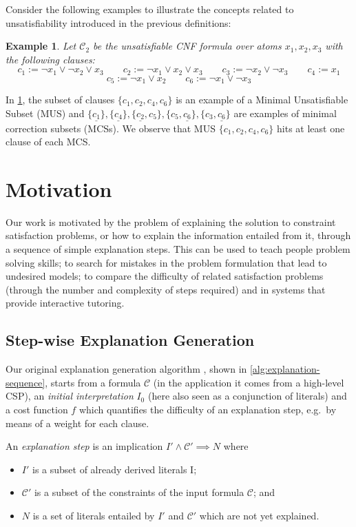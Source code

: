 \documentclass[twoside,11pt]{article}
\newcommand\m[1]{\mathcal{#1}}
\newtheorem{example}{Example}
\newcommand\formulac{\ensuremath{\m{C} }\xspace}
\begin{document}
Consider the following examples to illustrate the concepts related to unsatisfiability introduced in the previous definitions:
\begin{example}\label{example:unsat}
	Let $\formulac_2$ be the unsatisfiable CNF formula over atoms $x_1, x_2, x_3$ with the following clauses:
	\[ c_1 := \lnot x_1 \vee \lnot x_2 \vee x_3 \qquad  c_2 := \lnot x_1 \vee  x_2 \vee x_3  \qquad c_3 := \lnot x_2 \vee \lnot x_3 \qquad  c_4 := x_1\]
	\[ c_5 := \lnot x_1 \vee  x_2 \qquad  c_6 := \lnot x_1 \vee  \lnot x_3 \]

\end{example}
In \cref{example:unsat}, the subset of clauses $\{c_1, c_2, c_4, c_6\}$ is an example of a Minimal Unsatisfiable Subset (MUS) and $ \{\underline{c_1}\},\{\underline{c_4}\}, \{\underline{c_2},c_5\},\{c_5, \underline{c_6}\}, \{c_3, \underline{c_6}\}$ are examples of minimal correction subsets (MCSs). We observe that MUS $\{c_1, c_2, c_4, c_6\}$ hits at least one clause of each MCS. 



\section{Motivation}\label{sec:motivation}

Our work is motivated by the problem of explaining the solution to constraint satisfaction problems, or how to explain the information entailed from it, through a sequence of simple explanation steps. This can be used to teach people problem solving skills; to search for mistakes in the problem formulation that lead to undesired models; to compare the difficulty of related satisfaction problems (through the number and complexity of steps required) and in systems that provide interactive tutoring.  
\subsection{Step-wise Explanation Generation}
Our original explanation generation algorithm \cite{ecai/BogaertsGCG20}, shown in \cref{alg:explanation-sequence}, starts from a formula $\formulac$ (in the application it comes from a high-level CSP), an \emph{initial interpretation} $I_0$ (here also seen as a conjunction of literals) and a cost function $f$ which quantifies the difficulty of an explanation step, e.g.~by means of a weight for each clause. 

An \emph{explanation step} is an implication $I' \wedge \formulac' \implies N$ where 
\begin{itemize}
	\item $I'$ is a subset of already derived literals I;
	\item $\formulac'$ is a subset of the constraints of the input formula $\formulac$; and
	\item $N$ is a set of literals entailed by $I'$ and $\formulac'$ which are not yet explained.
\end{itemize} 
\end{document}
